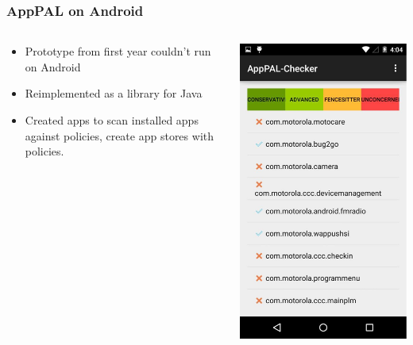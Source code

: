 \documentclass{beamer}
\begin{document}
\begin{frame}
  \frametitle{AppPAL on Android}
  \begin{columns}
    \begin{column}{0.5\linewidth}
      \begin{itemize}
      \item Prototype from first year couldn't run on Android
      \item Reimplemented as a library for Java
      \item Created apps to scan installed apps against policies, create app
        stores with policies.
      \end{itemize}
    \end{column}
    \begin{column}{0.5\linewidth}\centering
      \includegraphics[width=0.7\linewidth]{images/apppal-checker.png}
    \end{column}
  \end{columns}
\end{frame}
\end{document}
